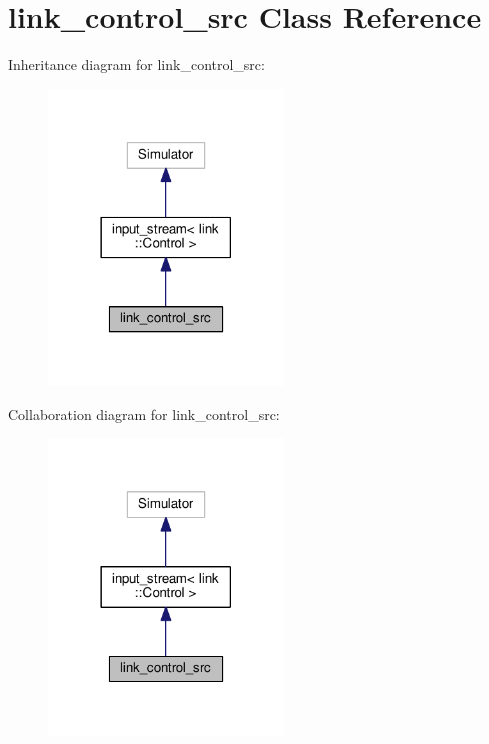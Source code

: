 \hypertarget{classlink__control__src}{}\section{link\+\_\+control\+\_\+src Class Reference}
\label{classlink__control__src}


Inheritance diagram for link\+\_\+control\+\_\+src\+:
\nopagebreak
\begin{figure}[H]
\begin{center}
\leavevmode
\includegraphics[width=177pt]{classlink__control__src__inherit__graph}
\end{center}
\end{figure}


Collaboration diagram for link\+\_\+control\+\_\+src\+:
\nopagebreak
\begin{figure}[H]
\begin{center}
\leavevmode
\includegraphics[width=177pt]{classlink__control__src__coll__graph}
\end{center}
\end{figure}
